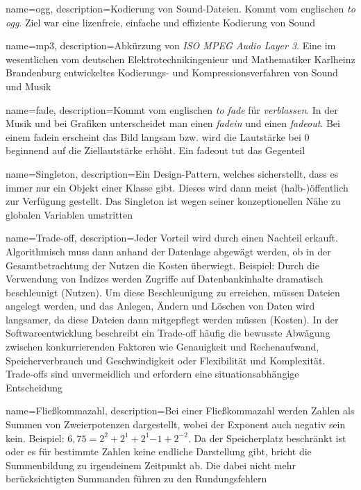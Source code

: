 {
	name={ogg},
	description={Kodierung von Sound-Dateien. Kommt vom englischen \emph{to ogg}. Ziel war eine lizenfreie, einfache und effiziente Kodierung von Sound} 
}

{
	name={mp3},
	description={Abkürzung von \emph{ISO MPEG Audio Layer 3}. Eine im wesentlichen vom deutschen Elektrotechnikingenieur und Mathematiker Karlheinz Brandenburg entwickeltes Kodierungs- und Kompressionsverfahren von Sound und Musik} 
}

{
	name={fade},
	description={Kommt vom englischen \emph{to fade} für \emph{verblassen}. In der Musik und bei Grafiken unterscheidet man einen \emph{fadein} und einen \emph{fadeout}. Bei einem fadein erscheint das Bild langsam bzw. wird die Lautstärke bei 0 beginnend auf die Ziellautstärke erhöht. Ein fadeout tut das Gegenteil} 
}

{
	name={Singleton},
	description={Ein Design-Pattern, welches sicherstellt, dass es immer nur ein Objekt einer Klasse gibt. Dieses wird dann meist (halb-)öffentlich zur Verfügung gestellt. Das Singleton ist wegen seiner konzeptionellen Nähe zu globalen Variablen umstritten} 
}

{
    name={Trade-off},
    description={Jeder Vorteil wird durch einen Nachteil erkauft. Algorithmisch muss dann anhand der Datenlage abgewägt werden, ob in der Gesamtbetrachtung der Nutzen die Kosten überwiegt. Beispiel: Durch die Verwendung von Indizes werden Zugriffe auf Datenbankinhalte dramatisch beschleunigt (Nutzen). Um diese Beschleunigung zu erreichen, müssen Dateien angelegt werden, und das Anlegen, Ändern und Löschen von Daten wird langsamer, da diese Dateien dann mitgepflegt werden müssen (Kosten). In der Softwareentwicklung beschreibt ein Trade-off häufig die bewusste Abwägung zwischen konkurrierenden Faktoren wie Genauigkeit und Rechenaufwand, Speicherverbrauch und Geschwindigkeit oder Flexibilität und Komplexität. Trade-offs sind unvermeidlich und erfordern eine situationsabhängige Entscheidung} 
}

{
    name={Fließkommazahl},
    description={Bei einer Fließkommazahl werden Zahlen als Summen von Zweierpotenzen dargestellt, wobei der Exponent auch negativ sein kein. Beispiel: $6,75 = 2^2 + 2^1 + 2^1{-1} + 2^{-2}$. Da der Speicherplatz beschränkt ist oder es für bestimmte Zahlen keine endliche Darstellung gibt, bricht die Summenbildung zu irgendeinem Zeitpunkt ab. Die dabei nicht mehr berücksichtigten Summanden führen zu den Rundungsfehlern}
}

